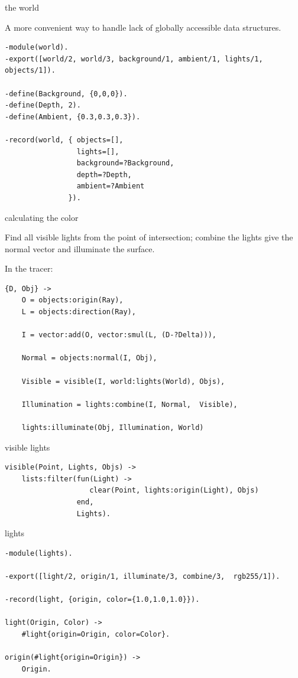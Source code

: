 \begin{frame}[fragile]{the world}

 \pause A more convenient way to handle lack of  globally accessible data structures.

\begin{verbatim}
-module(world).
-export([world/2, world/3, background/1, ambient/1, lights/1, objects/1]).

-define(Background, {0,0,0}).
-define(Depth, 2).
-define(Ambient, {0.3,0.3,0.3}).

-record(world, { objects=[], 
                 lights=[], 
                 background=?Background, 
                 depth=?Depth, 
                 ambient=?Ambient
               }).
\end{verbatim}

\end{frame}

\begin{frame}[fragile]{calculating the color}

Find all visible lights from the point of intersection; combine the lights give the normal vector and illuminate the surface.
\pause

In the tracer: \pause

\begin{verbatim}
{D, Obj} -> 
    O = objects:origin(Ray),
    L = objects:direction(Ray),

    I = vector:add(O, vector:smul(L, (D-?Delta))),

    Normal = objects:normal(I, Obj),

    Visible = visible(I, world:lights(World), Objs),

    Illumination = lights:combine(I, Normal,  Visible),

    lights:illuminate(Obj, Illumination, World)
\end{verbatim}
\end{frame}


\begin{frame}[fragile]{visible lights}

\begin{verbatim}
visible(Point, Lights, Objs) ->
    lists:filter(fun(Light) -> 
                    clear(Point, lights:origin(Light), Objs)  
                 end, 
                 Lights).
\end{verbatim}

\end{frame}


\begin{frame}[fragile]{lights}

\begin{verbatim}
-module(lights).

-export([light/2, origin/1, illuminate/3, combine/3,  rgb255/1]).

-record(light, {origin, color={1.0,1.0,1.0}}).

light(Origin, Color) ->
    #light{origin=Origin, color=Color}.

origin(#light{origin=Origin}) ->
    Origin.
\end{verbatim}

\end{frame}


